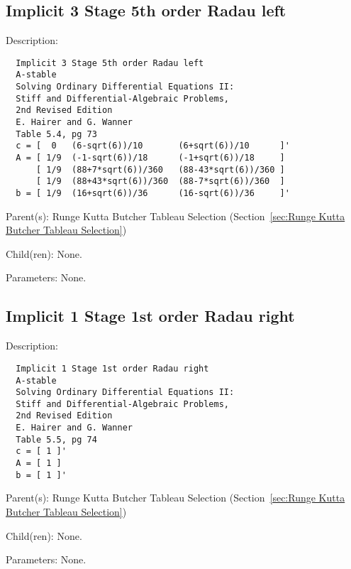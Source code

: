 \subsection{Implicit 3 Stage 5th order Radau left}
\label{sec:Implicit 3 Stage 5th order Radau left}

\begin{list}{}
  {\setlength{\leftmargin}{1.0in}
   \setlength{\labelwidth}{0.75in}
   \setlength{\labelsep}{0.125in}}
  \item[Description:]
\begin{verbatim}
  Implicit 3 Stage 5th order Radau left
  A-stable
  Solving Ordinary Differential Equations II:
  Stiff and Differential-Algebraic Problems,
  2nd Revised Edition
  E. Hairer and G. Wanner
  Table 5.4, pg 73
  c = [  0   (6-sqrt(6))/10       (6+sqrt(6))/10      ]'
  A = [ 1/9  (-1-sqrt(6))/18      (-1+sqrt(6))/18     ]
      [ 1/9  (88+7*sqrt(6))/360   (88-43*sqrt(6))/360 ]
      [ 1/9  (88+43*sqrt(6))/360  (88-7*sqrt(6))/360  ]
  b = [ 1/9  (16+sqrt(6))/36      (16-sqrt(6))/36     ]'
\end{verbatim}
  \item[Parent(s):]
    Runge Kutta Butcher Tableau Selection (Section~\ref{sec:Runge Kutta Butcher Tableau Selection})
  \item[Child(ren):]
    None. 
  \item[Parameters:]
    None. 
\end{list}

\subsection{Implicit 1 Stage 1st order Radau right}
\label{sec:Implicit 1 Stage 1st order Radau right}

\begin{list}{}
  {\setlength{\leftmargin}{1.0in}
   \setlength{\labelwidth}{0.75in}
   \setlength{\labelsep}{0.125in}}
  \item[Description:]
\begin{verbatim}
  Implicit 1 Stage 1st order Radau right
  A-stable
  Solving Ordinary Differential Equations II:
  Stiff and Differential-Algebraic Problems,
  2nd Revised Edition
  E. Hairer and G. Wanner
  Table 5.5, pg 74
  c = [ 1 ]'
  A = [ 1 ]
  b = [ 1 ]'
\end{verbatim}
  \item[Parent(s):]
    Runge Kutta Butcher Tableau Selection (Section~\ref{sec:Runge Kutta Butcher Tableau Selection})
  \item[Child(ren):]
    None. 
  \item[Parameters:]
    None. 
\end{list}

